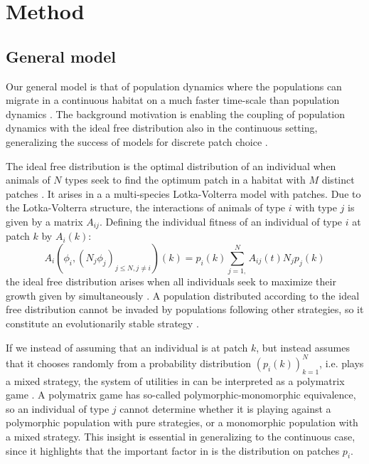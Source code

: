 \section{Method}


\subsection*{General model}

Our general model is that of population dynamics where the populations can migrate in a continuous habitat on a much faster time-scale than population dynamics \citep{cressman2006migration}. The background motivation is enabling the coupling of population dynamics with the ideal free distribution also in the continuous setting, generalizing the success of models for discrete patch choice \citep{valdovinos2010consequences}.

The ideal free distribution is the optimal distribution of an individual when animals of $N$ types seek to find the optimum patch in a habitat with $M$ distinct patches \citep{kvrivan2008ideal}. It arises in a a multi-species Lotka-Volterra model with patches. Due to the Lotka-Volterra structure, the interactions of animals of type $i$ with type $j$ is given by a matrix $A_{ij}$. Defining the individual fitness of an individual of type $i$ at patch $k$ by $A_i(k)$:
\begin{equation}
  A_i(\phi_i, (N_j \phi_j)_{j \leq N, j \neq i})(k) = p_i(k) \sum_{j=1,}^N {A_{ij}(t)N_j p_j}(k) %
  \label{eq:utility_pm}
\end{equation}
the ideal free distribution arises when all individuals seek to maximize their growth given by  simultaneously \citep{cressman2004ideal}. A population distributed according to the ideal free distribution cannot be invaded by populations following other strategies, so it constitute an evolutionarily stable strategy \citep{cressman2010ideal}.



If we instead of assuming that an individual is at patch $k$, but instead assumes that it chooses randomly from a probability distribution $(p_i(k))_{k=1}^N$, i.e. plays a mixed strategy, the system of utilities in  can be interpreted as a polymatrix game \citep{howson1972equilibria}. A polymatrix game has so-called polymorphic-monomorphic equivalence, so an individual of type $j$ cannot determine whether it is playing against a polymorphic population with pure strategies, or a monomorphic population with a mixed strategy. This insight is essential in generalizing to the continuous case, since it highlights that the important factor in  is the distribution on patches $p_i$.

